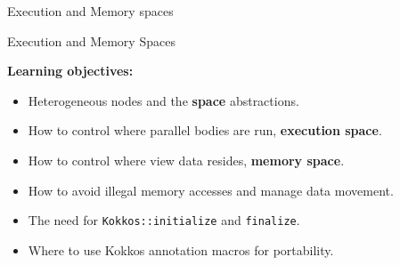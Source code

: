 \ifmedium
\begin{frame}[fragile]{Execution and Memory spaces}

  {\Huge Execution and Memory Spaces}

  \vspace{20pt}

  \textbf{Learning objectives:}
  \begin{itemize}
    \item{Heterogeneous nodes and the \textbf{space} abstractions.}
    \item{How to control where parallel bodies are run, \textbf{execution space}.}
    \item{How to control where view data resides, \textbf{memory space}.}
    \item{How to avoid illegal memory accesses and manage data movement.}
    \item{The need for \texttt{Kokkos::initialize} and \texttt{finalize}.}
    \item{Where to use Kokkos annotation macros for portability.}
  \end{itemize}

  \vspace{-20pt}

\end{frame}
\fi


